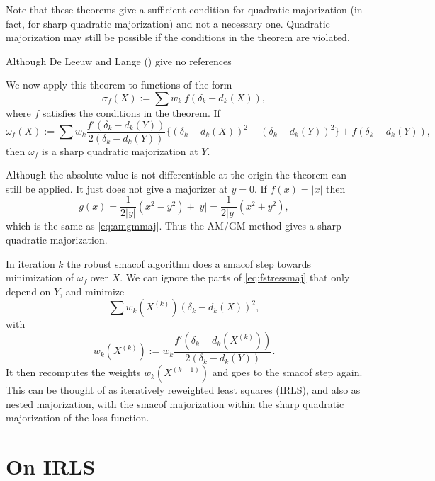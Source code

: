 \documentclass[
  12pt,
  letterpaper,
  DIV=11,
  numbers=noendperiod]{scrartcl}
\newcommand{\sectionbreak}{\pagebreak}
\begin{document}
Note that these theorems give a sufficient condition for quadratic
majorization (in fact, for sharp quadratic majorization) and not a
necessary one. Quadratic majorization may still be possible if the
conditions in the theorem are violated.

Although De Leeuw and Lange ()
give no references

We now apply this theorem to functions of the form \begin{equation}
\sigma_f(X):=\sum w_k\ f(\delta_k-d_k(X)),\label{eq:fstressdef}
\end{equation} where \(f\) satisfies the conditions in the theorem. If
\begin{equation}
\omega_f(X):=\sum w_k\frac{f'(\delta_k-d_k(Y))}{2(\delta_k-d_k(Y))}\{(\delta_k-d_k(X))^2-(\delta_k-d_k(Y))^2\}+f(\delta_k-d_k(Y)),\label{eq:fstressmaj}
\end{equation} then \(\omega_f\) is a sharp quadratic majorization at
\(Y\).

Although the absolute value is not differentiable at the origin the
theorem can still be applied. It just does not give a majorizer at
\(y=0\). If \(f(x)=|x|\) then \begin{equation}
g(x)=\frac{1}{2|y|}(x^2-y^2)+|y|=\frac{1}{2|y|}(x^2+y^2),\label{eq:abssharp}
\end{equation} which is the same as \eqref{eq:amgmmaj}. Thus the AM/GM
method gives a sharp quadratic majorization.

In iteration \(k\) the robust smacof algorithm does a smacof step
towards minimization of \(\omega_f\) over \(X\). We can ignore the parts
of \eqref{eq:fstressmaj} that only depend on \(Y\), and minimize
\begin{equation}
\sum w_k(X^{(k)})(\delta_k-d_k(X))^2,\label{eq:fstressaux}
\end{equation} with \begin{equation}
w_k(X^{(k)}):=w_k\frac{f'(\delta_k-d_k(X^{(k)}))}{2(\delta_k-d_k(Y))}.\label{eq:wkdef}
\end{equation} It then recomputes the weights \(w_k(X^{(k+1)})\) and
goes to the smacof step again. This can be thought of as iteratively
reweighted least squares (IRLS), and also as nested majorization, with
the smacof majorization within the sharp quadratic majorization of the
loss function.

\sectionbreak

\section{On IRLS}\label{on-irls}
\end{document}
